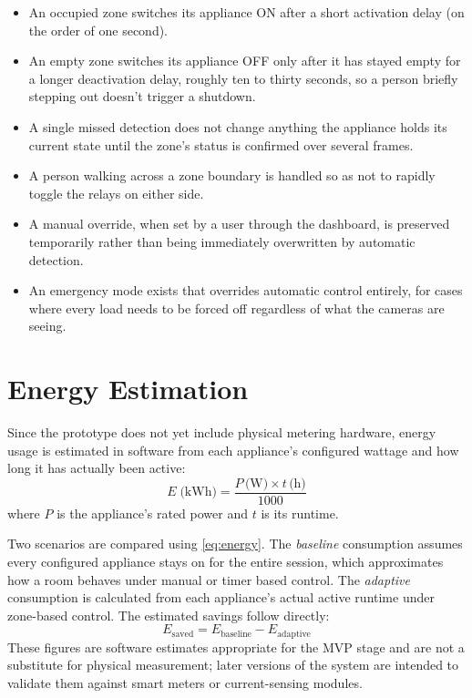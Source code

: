 \documentclass[conference]{IEEEtran}
\begin{document}
\begin{itemize}
    \item An occupied zone switches its appliance ON after a short activation delay (on the order of one second).
    \item An empty zone switches its appliance OFF only after it has stayed empty for a longer deactivation delay, roughly ten to thirty seconds, so a person briefly stepping out doesn't trigger a shutdown.
    \item A single missed detection does not change anything the appliance holds its current state until the zone's status is confirmed over several frames.
    \item A person walking across a zone boundary is handled so as not to rapidly toggle the relays on either side.
    \item A manual override, when set by a user through the dashboard, is preserved temporarily rather than being immediately overwritten by automatic detection.
    \item An emergency mode exists that overrides automatic control entirely, for cases where every load needs to be forced off regardless of what the cameras are seeing.
\end{itemize}

\section{Energy Estimation}
Since the prototype does not yet include physical metering hardware, energy usage is estimated in software from each appliance's configured wattage and how long it has actually been active:
\begin{equation}
E \; \text{(kWh)} = \frac{P \, \text{(W)} \times t \, \text{(h)}}{1000}
\label{eq:energy}
\end{equation}
where $P$ is the appliance's rated power and $t$ is its runtime.

Two scenarios are compared using \eqref{eq:energy}. The \textit{baseline} consumption assumes every configured appliance stays on for the entire session, which approximates how a room behaves under manual or timer based control. The \textit{adaptive} consumption is calculated from each appliance's actual active runtime under zone-based control. The estimated savings follow directly:
\begin{equation}
E_{\text{saved}} = E_{\text{baseline}} - E_{\text{adaptive}}
\label{eq:savings}
\end{equation}
These figures are software estimates appropriate for the MVP stage and are not a substitute for physical measurement; later versions of the system are intended to validate them against smart meters or current-sensing modules.
\end{document}
